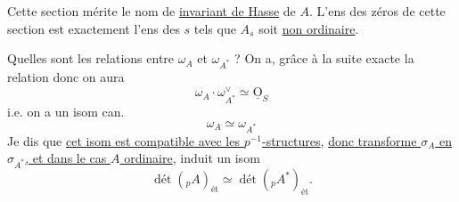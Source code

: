 Cette section mérite le nom de \uline{invariant de Hasse} de $A$. L'ens des zéros de cette section est exactement l'ens des $s$ tels que $A_s$ soit \uline{non ordinaire}.

Quelles sont les relations entre $\omega_A$ et $\omega_{A^*}$ ? On a, grâce à la suite exacte
la relation
donc on aura
\[
\omega_A\cdot\omega_{A^*}^\vee\simeq\underline{\mathrm O}_S
\]
i.e. on a un isom can.
\[
\omega_A\simeq\omega_{A^*}
\]
Je dis que \uline{cet isom est compatible avec les $p^{-1}$-structures}, \uline{donc transforme $\sigma_A$ en $\sigma_{A^*}$, et dans le cas $A$ ordinaire}, induit un isom
\[
\operatorname{\text{dét}}({}_pA)_{\text{ét}}\simeq\operatorname{\text{dét}}({}_pA^*)_{\text{ét}}.
\]
